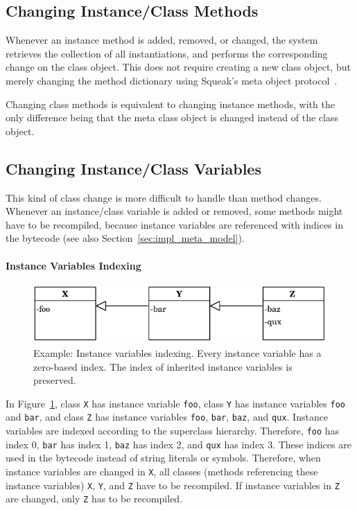 \subsection{Changing Instance/Class Methods}
Whenever an instance method is added, removed, or changed, the system retrieves the collection of all instantiations, and performs the corresponding change on the class object. This does not require creating a new class object, but merely changing the method dictionary using Squeak's meta object protocol~\cite{Goldberg:1983:SLI:273, Kiczales:1991:AMP:574212}.

Changing class methods is equivalent to changing instance methods, with the only difference being that the meta class object is changed instead of the class object.

\subsection{Changing Instance/Class Variables}
This kind of class change is more difficult to handle than method changes. Whenever an instance/class variable is added or removed, some methods might have to be recompiled, because instance variables are referenced with indices in the bytecode (see also Section~\ref{sec:impl_meta_model}). 

\paragraph{Instance Variables Indexing}
\begin{figure}[!htp]
	\centering
	\includegraphics[scale=1]{inst_vars.pdf}
	\caption[Example: Instance variables indexing]{Example: Instance variables indexing. Every instance variable has a zero-based index. The index of inherited instance variables is preserved.}
	\label{fig:impl_inst_vars}
\end{figure}

In Figure~\ref{fig:impl_inst_vars}, class \texttt{X} has instance variable \texttt{foo}, class \texttt{Y} has instance variables \texttt{foo} and \texttt{bar}, and class \texttt{Z} has instance variables \texttt{foo}, \texttt{bar}, \texttt{baz}, and \texttt{qux}. Instance variables are indexed according to the superclass hierarchy. Therefore, \texttt{foo} has index 0, \texttt{bar} has index 1, \texttt{baz} has index 2, and \texttt{qux} has index 3. These indices are used in the bytecode instead of string literals or symbols. Therefore, when instance variables are changed in \texttt{X}, all classes (methods referencing these instance variables) \texttt{X}, \texttt{Y}, and \texttt{Z} have to be recompiled. If instance variables in \texttt{Z} are changed, only \texttt{Z} has to be recompiled.

